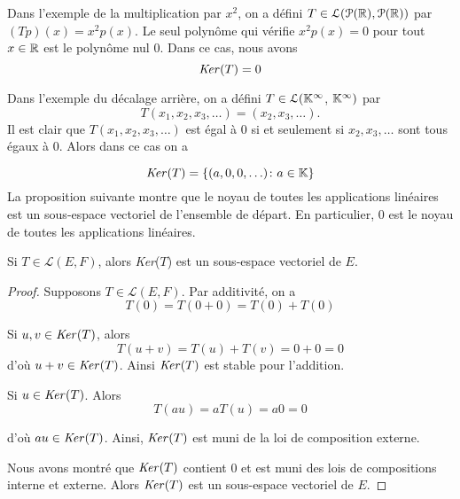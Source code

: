 \documentclass[12pt]{book}
\begin{document}
Dans l'exemple de la multiplication par $x^2$, on a défini $T\in \mathcal{L}(\mathcal{P}(\mathbb{R}),\mathcal{P}(\mathbb{R}))$ par $(Tp)(x)=x^2p(x)$. Le seul polynôme qui vérifie $x^2p(x)=0$ pour tout $x\in\mathbb{R}$ est le polynôme nul 0. Dans ce cas, nous avons 
\begin{equation*}
    \textrm{\textit{Ker}($T$)}={0}
\end{equation*}


Dans l'exemple du décalage arrière, on a défini $T \in \mathcal{L}(\mathbb{K}^{\infty}$, $\mathbb{K}^{\infty})$ par 
\begin{equation*}
    T(x_1, x_2, x_3, \ldots) = (x_2, x_3, \ldots).
\end{equation*}
Il est clair que $T(x_1, x_2, x_3, \ldots)$ est égal à 0 si et seulement si $x_2, x_3, \ldots$ sont tous égaux à 0. Alors dans ce cas on a 

\begin{equation*}
    \textrm{\textit{Ker}($T$)}=\{(a,0,0,\ldots)\colon a\in\mathbb{K}\}
\end{equation*}
La proposition suivante montre que le noyau de toutes les applications linéaires est un sous-espace vectoriel de l'ensemble de départ. En particulier, 0 est le noyau de toutes les applications linéaires.

\noindent
\begin{prop}
Si $T \in \mathcal{L}(E,F)$, alors \textit{Ker}($T$) est un sous-espace vectoriel de $E$.
\begin{proof}
Supposons $T \in \mathcal{L}(E,F)$. Par additivité, on a 
\begin{equation*}
    T(0) = T(0+0) = T(0) + T(0)
\end{equation*}

Si $u,v\in\textrm{\textit{Ker}}(T)$, alors 
\begin{equation*}
    T(u+v)=T(u)+T(v)=0+0=0
\end{equation*}
d'où $u+v\in\textrm{\textit{Ker}}(T)$. Ainsi $\textrm{\textit{Ker}}(T)$ est stable pour l'addition.

Si $u\in \textrm{\textit{Ker}}(T)$. Alors 
\begin{equation*}
    T(au)=aT(u)=a0=0
\end{equation*}

\noindent
d'où $au\in \textrm{\textit{Ker}}(T)$. Ainsi, $\textrm{\textit{Ker}}(T)$ est muni de la loi de composition externe.

Nous avons montré que $\textrm{\textit{Ker}}(T)$ contient 0 et est muni des lois de compositions interne et externe. Alors $\textrm{\textit{Ker}}(T)$ est un sous-espace vectoriel de $E$.
\end{proof}
\end{prop}
\end{document}
